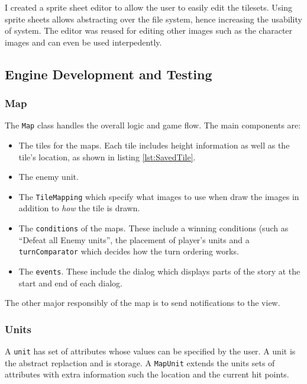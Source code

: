 I created a sprite sheet editor to allow the user to easily edit the tilesets. Using sprite sheets allows abstracting over the file system, hence increasing the usability of system. The editor was reused for editing other images such as the character images and can even be used interpedently.

\clearpage
\subsection{Engine Development and Testing}
\label{sub:engine_development_and_testing}
\subsubsection{Map}
\label{ssub:maps}


The \texttt{Map} class handles the overall logic and game flow.   The main components are:
\begin{itemize}
\item The tiles for the maps. Each tile includes height information as well as the tile's location, as shown in listing \ref{lst:SavedTile}.

\item The enemy unit.     

\item The \texttt{TileMapping} which specify what images to use when draw the images in addition to \emph{how} the tile is drawn. 

\item  The \texttt{conditions} of the maps. These include a winning conditions (such as ``Defeat all Enemy units'',  the placement of player's units and a \texttt{turnComparator} which decides how the turn ordering works.  

\item  The \texttt{events}. These include the dialog which displays parts of the story at the start and end of each dialog. 
\end{itemize}

The other major responsibly of the map is to send notifications to the view.  


\subsubsection{Units}
\label{ssub:units}
A \texttt{unit} has set of attributes whose values can be specified by the user. A unit is the abstract replaction and is storage.  A \texttt{MapUnit} extends the units sets of attributes with extra information such the location and the current hit points.

